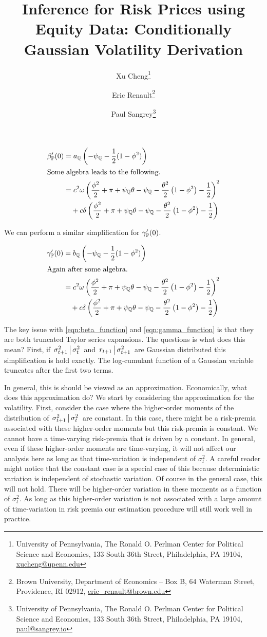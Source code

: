 \documentclass[11pt, letterpaper, twoside, final]{article}
\author{Xu Cheng\thanks{University of Pennsylvania, The Ronald O. Perlman Center for Political Science and
    Economics, 133 South 36th Street, Philadelphia, PA 19104, \href{mailto:xucheng@upenn.edu}{xucheng@upenn.edu}}
    \and 
    Eric Renault\thanks{Brown University, Department of Economics -- Box B, 64 Waterman Street, Providence, RI
    02912, \href{mailto:eric_renault@brown.edu}{eric\_renault@brown.edu}}
    \and 
    Paul Sangrey\thanks{University of Pennsylvania, The Ronald O. Perlman Center for Political Science and
    Economics, 133 South 36th Street, Philadelphia, PA 19104, \href{mailto:paul@sangrey.io}{paul@sangrey.io}}}
\title{Inference for Risk Prices using Equity Data: Conditionally Gaussian Volatility Derivation}
\begin{document}
\begin{align}
    \label{eqn:beta_function}
    \beta_{\PP}'(0)  &= a_{\QQ}\left(-\psi_{\QQ} - \frac{1}{2} (1- \phi^2)\right)   \\
%
    \intertext{Some algebra leads to the following.}
%
    &= c^{2} \omega \left(\frac{\phi^{2}}{2} + \pi + \psi_{\QQ} \theta - \psi_{\QQ} - \frac{\theta^{2}}{2}
       \left(1- \phi^{2}\right) - \frac{1}{2}\right)^{2}  \\
    &\quad + c \delta \left(\frac{\phi^{2}}{2} + \pi + \psi_{\QQ} \theta - \psi_{\QQ} - \frac{\theta^{2}}{2}
      \left(1 - \phi^{2} \right) - \frac{1}{2}\right)  \nonumber
\end{align}

We can perform a similar simplification for $\gamma_{\mathbb{P}}'(0)$.

\begin{align}
    \label{eqn:gamma_function}
    \gamma_{\PP}'(0)  &= b_{\QQ}\left(-\psi_{\QQ} - \frac{1}{2} (1- \phi^2)\right)  \\
%
    \intertext{Again after some algebra.}
%
        &= c^{2} \omega \left(\frac{\phi^{2}}{2} + \pi + \psi_{\QQ} \theta - \psi_{\QQ} - \frac{\theta^{2}}{2}
           \left(1 - \phi^{2} \right) - \frac{1}{2}\right)^{2}   \\
        &\quad + c \delta \left(\frac{\phi^{2}}{2} + \pi + \psi_{\QQ} \theta - \psi_{\QQ} - \frac{\theta^{2}}{2}
          \left(1- \phi^{2}\right) - \frac{1}{2}\right) \nonumber 
\end{align}

The key issue with  \cref{eqn:beta_function} and \cref{eqn:gamma_function} is that they are both truncated Taylor
series expansions. 
The questions is what does this mean?
First, if $\left. \sigma^2_{t+1} \,\middle\vert\, \sigma^2_t \right.$ and $\left. r_{t+1} \,\middle\vert\,  \sigma^2_{t+1}\right.$
are Gaussian distributed this simplification is hold exactly.
The log-cumulant function of a Gaussian variable truncates after the first two terms.

In general, this is should be viewed as an approximation.
Economically, what does this approximation do?
We start by considering the approximation for the volatility.
First, consider the case where  the higher-order moments of the distribution of $\left. \sigma^2_{t+1}
\,\middle\vert\, \sigma^2_t \right.$ are constant. 
In this case, there might be a risk-premia associated with these higher-order moments but this risk-premia is
constant.
We cannot have a time-varying risk-premia that is driven by a constant.
In general, even if these higher-order moments are time-varying, it will not affect our analysis here as long as
that time-variation is independent of $\sigma^2_t$.
A careful reader might notice that the constant case is a special case of this because deterministic variation is
independent  of stochastic variation.
Of course in the general case, this will not hold.
There will be higher-order variation in these moments as a function of $\sigma^2_t$. 
As long as this higher-order variation is not associated with a large amount of time-variation in risk premia our
estimation procedure will still work well in practice.
\end{document}
